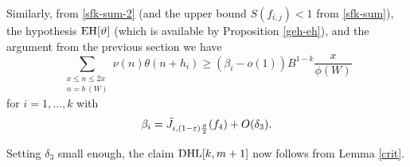 Similarly, from \eqref{sfk-sum-2} (and the upper bound $S(f_{i,j}) < 1$ from \eqref{sfk-sum}), the hypothesis $\operatorname*{EH}[\vartheta]$ (which is available by Proposition \ref{geh-eh}), and the argument from the previous section we have
$$ 
 \sum_{\substack{x \leq n \leq 2x\\ n = b\ (W)}} \nu(n) \theta(n+h_i) \geq (\beta_i - o(1)) B^{1-k} \frac{x}{\phi(W)}$$
for $i=1,\dots,k$ with
$$ \beta_i = \tilde J_{i, (1-\varepsilon) \frac{\vartheta}{2}}( f_4 ) + O(\delta_3).$$

Setting $\delta_3$ small enough, the claim $\operatorname*{DHL}[k,m+1]$ now follows from Lemma \ref{crit}.